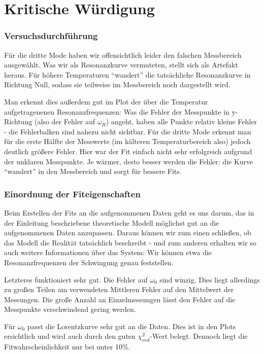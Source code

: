 \section{Kritische Würdigung}

\subsubsection*{Versuchsdurchführung}

Für die dritte Mode haben wir offensichtlich leider den falschen Messbereich ausgewählt.
Was wir als Resonanzkurve vermuteten, stellt sich als Artefakt heraus.
Für höhere Temperaturen \enquote{wandert} die tatsächliche Resonanzkurve in Richtung Null, sodass sie teilweise im Messbereich noch dargestellt wird.

Man erkennt dies außerdem gut im Plot der über die Temperatur aufgetragenenen Resonanzfrequenzen:
Was die Fehler der Messpunkte in y-Richtung (also der Fehler auf $\omega_R$) angeht, haben alle Punkte relativ kleine Fehler - die Fehlerbalken sind nahezu nicht sichtbar.
Für die dritte Mode erkennt man für die erste Hälfte der Messwerte (im kälteren Temperaturbereich also) jedoch deutlich größere Fehler.
Hier war der Fit einfach nicht sehr erfolgreich aufgrund der unklaren Messpunkte.
Je wärmer, desto besser werden die Fehler: die Kurve \enquote{wandert} in den Messbereich und sorgt für bessere Fits.

\subsubsection*{Einordnung der Fiteigenschaften}

Beim Erstellen der Fits an die aufgenommenen Daten geht es uns darum, das in der Einleitung beschriebene theoretische Modell möglichst gut an die aufgenommenen Daten anzupassen.
Daraus können wir zum einen schließen, ob das Modell die Realität tatsächlich beschreibt - und zum anderen erhalten wir so auch weitere Informationen über das System:
Wir können etwa die Resonanzfrequenzen der Schwingung genau feststellen.

Letzteres funktioniert sehr gut.
Die Fehler auf $\omega_0$ sind winzig.
Dies liegt allerdings zu großen Teilen am verwendeten Mittleren Fehler auf den Mittelwert der Messungen.
Die große Anzahl an Einzelmessungen lässt den Fehler auf die Messpunkte verschwindend gering werden.

Für $\omega_{0}$ passt die Lorentzkurve sehr gut an die Daten.
Dies ist in den Plots ersichtlich und wird auch durch den guten $\chi_{red}^2$-Wert belegt.
Dennoch liegt die Fitwahrscheinlichkeit nur bei unter 10\%.

